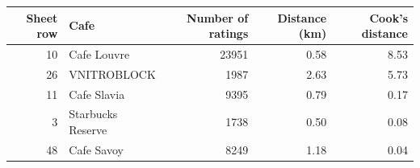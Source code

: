 \begingroup\footnotesize
\begin{tabular}{rlrrr}
  \toprule
Sheet row & Cafe & Number of ratings & Distance (km) & Cook's distance \\ 
  \midrule
 10 & Cafe Louvre & 23951 & 0.58 & 8.53 \\ 
   26 & VNITROBLOCK & 1987 & 2.63 & 5.73 \\ 
   11 & Cafe Slavia & 9395 & 0.79 & 0.17 \\ 
    3 & Starbucks Reserve & 1738 & 0.50 & 0.08 \\ 
   48 & Cafe Savoy & 8249 & 1.18 & 0.04 \\ 
   \bottomrule
\end{tabular}
\endgroup
